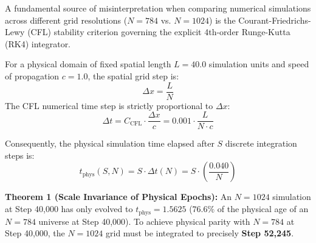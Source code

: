 \documentclass[11pt, twoside]{article}
\begin{document}
A fundamental source of misinterpretation when comparing numerical simulations across different grid resolutions ($N=784$ vs. $N=1024$) is the Courant-Friedrichs-Lewy (CFL) stability criterion governing the explicit 4th-order Runge-Kutta (RK4) integrator.

For a physical domain of fixed spatial length $L = 40.0$ simulation units and speed of propagation $c = 1.0$, the spatial grid step is:
\begin{equation}
\Delta x = \frac{L}{N}
\end{equation}
The CFL numerical time step is strictly proportional to $\Delta x$:
\begin{equation}
\Delta t = C_{\text{CFL}} \cdot \frac{\Delta x}{c} = 0.001 \cdot \frac{L}{N \cdot c}
\end{equation}

Consequently, the physical simulation time elapsed after $S$ discrete integration steps is:
\begin{equation}
t_{\text{phys}}(S, N) = S \cdot \Delta t(N) = S \cdot \left( \frac{0.040}{N} \right)
\end{equation}

\begin{table}[H]
\centering
\caption{Exact CFL Physical Time Scaling and Step Parity between $N=784$ and $N=1024$ Grids.}
\label{tab:cfl_scaling}
\end{table}

\textbf{Theorem 1 (Scale Invariance of Physical Epochs):} An $N=1024$ simulation at Step 40,000 has only evolved to $t_{\text{phys}} = 1.5625$ ($76.6\%$ of the physical age of an $N=784$ universe at Step 40,000). To achieve physical parity with $N=784$ at Step 40,000, the $N=1024$ grid must be integrated to precisely \textbf{Step 52,245}.
\end{document}
